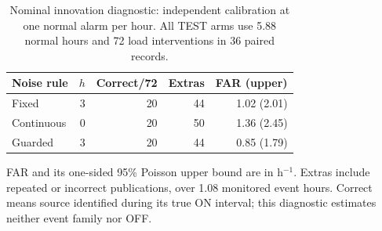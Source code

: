\begin{table}[t]\centering
\caption{Nominal innovation diagnostic: independent calibration at one normal alarm per hour. All TEST arms use 5.88 normal hours and 72 load interventions in 36 paired records.}
\label{tab:adaptive-diagnostic}
\footnotesize\setlength{\tabcolsep}{3.5pt}
\begin{tabular}{lrrrr}
\toprule
Noise rule & $h$ & Correct/72 & Extras & FAR (upper)\\
\midrule
Fixed & 3 & 20 & 44 & 1.02 (2.01)\\
Continuous & 0 & 20 & 50 & 1.36 (2.45)\\
Guarded & 3 & 20 & 44 & 0.85 (1.79)\\
\bottomrule
\end{tabular}
\par\smallskip\parbox{\columnwidth}{\footnotesize FAR and its one-sided 95\% Poisson upper bound are in h$^{-1}$. Extras include repeated or incorrect publications, over 1.08 monitored event hours. Correct means source identified during its true ON interval; this diagnostic estimates neither event family nor OFF.}
\end{table}
